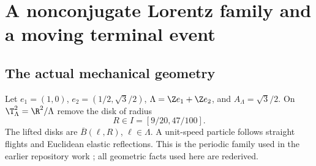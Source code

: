 \section{A nonconjugate Lorentz family and a moving terminal event}\label{sec:lorentz-local}
\subsection{The actual mechanical geometry}
Let $e_1=(1,0)$, $e_2=(1/2,\sqrt3/2)$, $\Lambda=\Z e_1+\Z e_2$, and
$A_\Lambda=\sqrt3/2$. On $\T_\Lambda^2=\R^2/\Lambda$ remove the disk of radius
\[
 R\in I=[9/20,47/100].
\]
The lifted disks are $\overline B(\ell,R)$, $\ell\in\Lambda$. A unit-speed particle follows straight flights and Euclidean elastic reflections. This is the periodic family used in the earlier repository work \cite{RepoLorentz}; all geometric facts used here are rederived.

